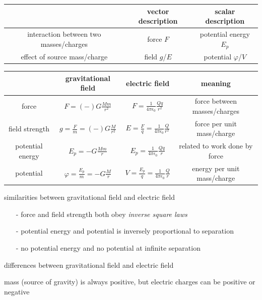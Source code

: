 \begin{center}
	\begin{tabular}{|c|c|c|}
		\hline
		& vector description & scalar description \\ \hline 
		interaction between two masses/charges & force $F$ & potential energy $E_p$ \\ \hline
		effect of source mass/charge & field $g$/$E$ & potential $\varphi$/$V$ \\ \hline
	\end{tabular}
\end{center}

\begin{center}
{\renewcommand{\arraystretch}{1.28}
\begin{tabular}{|c|c|c|c|}
\hline
& gravitational field & electric field & meaning \\ \hline 
force & $F=(-)G \frac{Mm}{r^2}$ & $F=\frac{1}{4\pi\epsilon_0} \frac{Qq}{r^2}$ & force between masses/charges\\ [1ex] \hline
field strength & $g= \frac{F}{m} = (-)G \frac{M}{r^2}$ & $E= \frac{F}{q} = \frac{1}{4\pi\epsilon_0} \frac{Q}{r^2}$ & force per unit mass/charge\\ [1ex] \hline
potential energy &  $E_p = -G \frac{Mm}{r}$ & $E_p=\frac{1}{4\pi\epsilon_0} \frac{Qq}{r}$ & related to work done by force \\ [1ex] \hline
potential & $\varphi = \frac{E_p}{m} = -G \frac{M}{r}$ & $V = \frac{E_p}{q} = \frac{1}{4\pi\epsilon_0} \frac{Q}{r}$ & energy per unit mass/charge\\ [1ex] \hline
\end{tabular}}
\end{center}

\cmt similarities between gravitational field and electric field

\begin{itemize}
	\item[-] force and field strength both obey \emph{inverse square laws}
	
	\item[-] potential energy and potential is inversely proportional to separation
	
	\item[-] no potential energy and no potential at infinite separation
\end{itemize}

\cmt differences between gravitational field and electric field

mass (source of gravity) is always positive, but electric charges can be positive or negative

